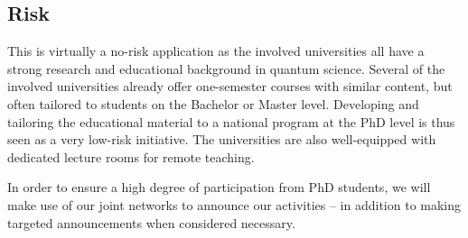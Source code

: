 \documentclass{scrreprt}
\begin{document}
\subsection{Risk}

This is virtually a no-risk application as the involved universities all have a
strong research and educational background in quantum science. Several
of the involved universities already offer one-semester courses with
similar content, but often tailored to students on the Bachelor or Master level. Developing and tailoring the educational material to
a national program at the PhD level is thus seen as a very low-risk
initiative. The universities are also well-equipped with dedicated lecture rooms for remote teaching.

In order to ensure a high degree of participation from PhD students, we will make use of our joint networks to announce our activities -- in addition to making targeted announcements when considered necessary.
\end{document}
